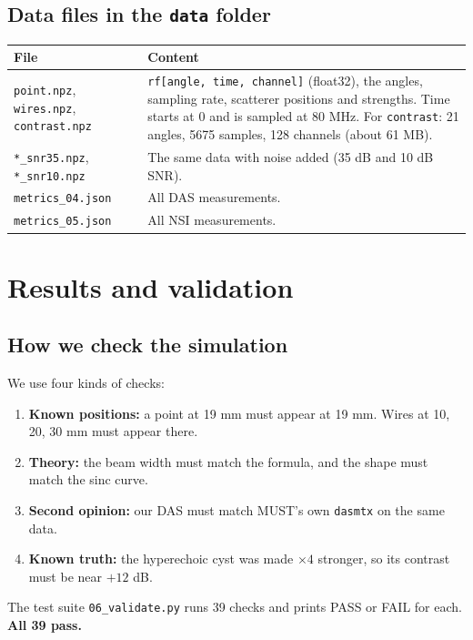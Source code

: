 \documentclass[11pt,a4paper]{article}
\newcommand{\file}[1]{\texttt{#1}}
\begin{document}
\subsection{Data files in the \file{data} folder}
\begin{center}
\small
\begin{tabular}{@{}p{5.2cm}p{9.3cm}@{}}
\toprule
\textbf{File} & \textbf{Content}\\
\midrule
\file{point.npz}, \file{wires.npz}, \file{contrast.npz} & \texttt{rf[angle, time, channel]} (float32), the angles, sampling rate, scatterer positions and strengths. Time starts at 0 and is sampled at 80 MHz. For \file{contrast}: 21 angles, 5675 samples, 128 channels (about 61 MB).\\
\file{*\_snr35.npz}, \file{*\_snr10.npz} & The same data with noise added (35 dB and 10 dB SNR).\\
\file{metrics\_04.json} & All DAS measurements.\\
\file{metrics\_05.json} & All NSI measurements.\\
\bottomrule
\end{tabular}
\end{center}

\section{Results and validation}

\subsection{How we check the simulation}
We use four kinds of checks:
\begin{enumerate}
\item \textbf{Known positions:} a point at 19 mm must appear at 19 mm. Wires at 10, 20, 30 mm must appear there.
\item \textbf{Theory:} the beam width must match the formula, and the shape must match the sinc curve.
\item \textbf{Second opinion:} our DAS must match MUST's own \texttt{dasmtx} on the same data.
\item \textbf{Known truth:} the hyperechoic cyst was made $\times4$ stronger, so its contrast must be near $+12$ dB.
\end{enumerate}
The test suite \file{06\_validate.py} runs 39 checks and prints PASS or FAIL for each. \textbf{All 39 pass.}
\end{document}
